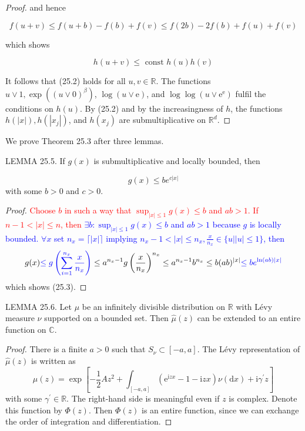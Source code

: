 \documentclass[a4paper,11pt]{article}
\begin{document}
\begin{proof}
    and hence

    $$
        f(u+v) \leq f(u+b)-f(b)+f(v) \leq f(2 b)-2 f(b)+f(u)+f(v)
    $$

    which shows


    \begin{equation*}
        h(u+v) \leq \text { const } h(u) h(v) \tag{25.2}
    \end{equation*}


    It follows that (25.2) holds for all $u, v \in \mathbb{R}$. The functions
    $u \vee 1, \exp \left((u \vee 0)^{\beta}\right)$, $\log (u \vee \mathrm{e})$, and
    $\log \log \left(u \vee \mathrm{e}^{\mathrm{e}}\right)$ fulfil the conditions on
    $h(u)$. By (25.2) and by the increasingness of $h$, the functions $h(|x|), h\left(\left|x_{j}\right|\right)$, and
    $h\left(x_{j}\right)$ are submultiplicative on $\mathbb{R}^{d}$.

\end{proof}

We prove Theorem 25.3 after three lemmas.

LEMMA 25.5. If $g(x)$ is submultiplicative and locally bounded, then

\begin{equation*}
    g(x) \leq b e^{c|x|} \tag{25.3}
\end{equation*}
with some $b>0$ and $c>0$.

\begin{proof}
    \textcolor{red}{
        Choose $b$ in such a way that $\sup _{|x| \leq 1} g(x) \leq b$ and $a b>1$. If $n-1<|x| \leq n$,
        then
    }
    \textcolor{blue}{
        $\exists b: \sup _{|x| \leq 1} g(x) \leq b$ and $a b>1$ because $g$ is locally bounded.
        $\forall x$ set $n_x = \lceil \left| x \right| \rceil$ implying $n_x-1 < \left| x \right| \leq n_x, \frac{x}{n_x} \in \{u | |u| \leq 1\} $, then
    }
    $$
        g(x)
        \textcolor{blue}{
            \le g\left(\sum_{i=1}^{n_x} \frac{x}{n_x}\right)
        }
        \leq a^{n_x-1} g\left(\frac{x}{n_x} \right)^{n_x} \leq a^{n_x-1} b^{n_x} \leq b(a b)^{|x|}
        \textcolor{blue}{
            \le b e^{\ln \left(ab\right)|x|}
        }
    $$
    which shows (25.3).
\end{proof}

LEMMA 25.6. Let $\mu$ be an infinitely divisible distribution on $\mathbb{R}$ with Lévy measure $\nu$
supported on a bounded set. Then $\widehat{\mu}(z)$ can be extended to an entire function on $\mathbb{C}$.

\begin{proof}
    There is a finite $a>0$ such that $S_{\nu} \subset[-a, a]$. The Lévy representation of $\widehat{\mu}(z)$ is written as
    $$
        \widehat{\mu}(z)=\exp \left[-\frac{1}{2} A z^{2}+\int_{[-a, a]}\left(\mathrm{e}^{\mathrm{i} z x}-1-\mathrm{i} z x\right) \nu(\mathrm{d} x)+\mathrm{i} \gamma^{\prime} z\right]
    $$
    with some $\gamma^{\prime} \in \mathbb{R}$. The right-hand side is meaningful even if $z$ is complex. Denote
    this function by $\Phi(z)$. Then $\Phi(z)$ is an entire function, since we can exchange the order of
    integration and differentiation.
\end{proof}
\end{document}
